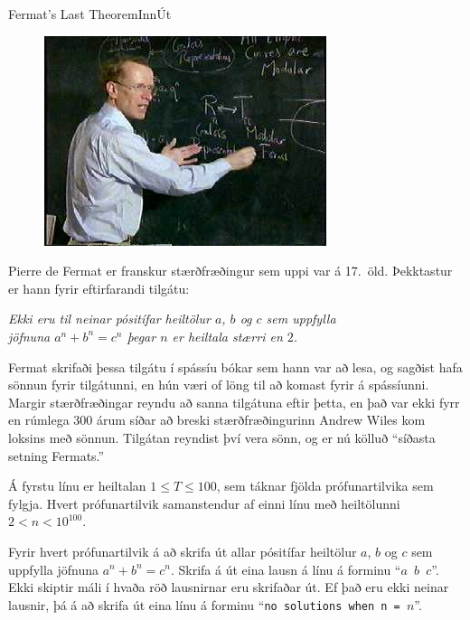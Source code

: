\begin{problem}{Fermat's Last Theorem}{Inn}{Út}{~}{~}

	\begin{figure}
		\vspace{-25pt}
		\begin{center}
			\includegraphics[scale=0.5]{../FermatsLastTheorem/Wiles5.jpg}
		\end{center}
		\vspace{-50pt}
	\end{figure}

	Pierre de Fermat er franskur stærðfræðingur sem uppi var á 17.\ öld. Þekktastur er hann fyrir eftirfarandi tilgátu:

	\begin{center}
		\textit{Ekki eru til neinar pósitífar heiltölur $a$, $b$ og $c$ sem uppfylla\\ jöfnuna $a^n + b^n = c^n$ þegar $n$ er heiltala stærri en $2$.}
	\end{center}

	Fermat skrifaði þessa tilgátu í spássíu bókar sem hann var að lesa, og sagðist hafa sönnun fyrir tilgátunni, en hún væri of löng til að komast fyrir á spássíunni. Margir stærðfræðingar reyndu að sanna tilgátuna eftir þetta, en það var ekki fyrr en rúmlega 300 árum síðar að breski stærðfræðingurinn Andrew Wiles kom loksins með sönnun. Tilgátan reyndist því vera sönn, og er nú kölluð "`síðasta setning Fermats."'

	\Input

		Á fyrstu línu er heiltalan $1 \leq T \leq 100$, sem táknar fjölda prófunartilvika sem fylgja. Hvert prófunartilvik samanstendur af einni línu með heiltölunni $2 < n < 10^{100}$.

	\Output

		Fyrir hvert prófunartilvik á að skrifa út allar pósitífar heiltölur $a$, $b$ og $c$ sem uppfylla jöfnuna $a^n + b^n = c^n$. Skrifa á út eina lausn á línu á forminu "`\texttt{$a$ $b$ $c$}"'. Ekki skiptir máli í hvaða röð lausnirnar eru skrifaðar út. Ef það eru ekki neinar lausnir, þá á að skrifa út eina línu á forminu "`\texttt{no solutions when n = $n$}"'.

	\Examples

		\begin{example}
		\end{example}

\end{problem}